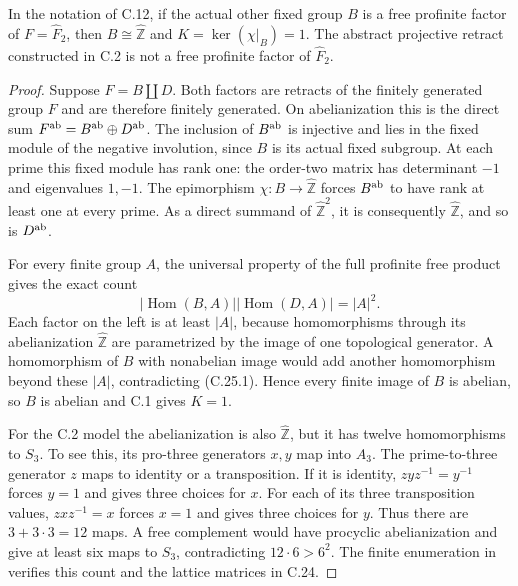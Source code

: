 In the notation of C.12, if the actual other
fixed group $B$ is a free profinite factor
of $F=\widehat F_2$, then $B\cong\widehat{\mathbb Z}$
and $K=\ker(\chi|_B)=1$.  The abstract
projective retract constructed in C.2 is
not a free profinite factor of $\widehat F_2$.

\begin{proof}
Suppose $F=B\amalg D$.  Both factors are
retracts of the finitely generated group
$F$ and are therefore finitely generated.
On abelianization this is the direct sum
$F^{\rm ab}=B^{\rm ab}\oplus D^{\rm ab}$.
The inclusion of $B^{\rm ab}$ is injective
and lies in the fixed module of the
negative involution, since $B$ is its
actual fixed subgroup.  At each prime this
fixed module has rank one: the order-two
matrix has determinant $-1$ and eigenvalues
$1,-1$.  The epimorphism
$\chi:B\to\widehat{\mathbb Z}$ forces
$B^{\rm ab}$ to have rank at least one
at every prime.  As a direct summand of
$\widehat{\mathbb Z}^2$, it is consequently
$\widehat{\mathbb Z}$, and so is
$D^{\rm ab}$.

For every finite group $A$, the universal
property of the full profinite free product
gives the exact count
\[
 |\operatorname{Hom}(B,A)|
 |\operatorname{Hom}(D,A)|=|A|^2.                         \tag{C.25.1}
\]
Each factor on the left is at least $|A|$,
because homomorphisms through its abelianization
$\widehat{\mathbb Z}$ are parametrized by the
image of one topological generator.
A homomorphism of $B$ with nonabelian image
would add another homomorphism beyond these
$|A|$, contradicting (C.25.1).  Hence every
finite image of $B$ is abelian, so $B$ is
abelian and C.1 gives $K=1$.

For the C.2 model the abelianization is also
$\widehat{\mathbb Z}$, but it has twelve
homomorphisms to $S_3$.  To see this, its
pro-three generators $x,y$ map into $A_3$.
The prime-to-three generator $z$ maps to
identity or a transposition.  If it is
identity, $zyz^{-1}=y^{-1}$ forces $y=1$
and gives three choices for $x$.
For each of its three transposition values,
$zxz^{-1}=x$ forces $x=1$ and gives three
choices for $y$.  Thus there are
$3+3\cdot3=12$ maps.  A free complement
would have procyclic abelianization and
give at least six maps to $S_3$, contradicting
$12\cdot6>6^2$.  The finite enumeration in
 verifies
this count and the lattice matrices in C.24.
\end{proof}

